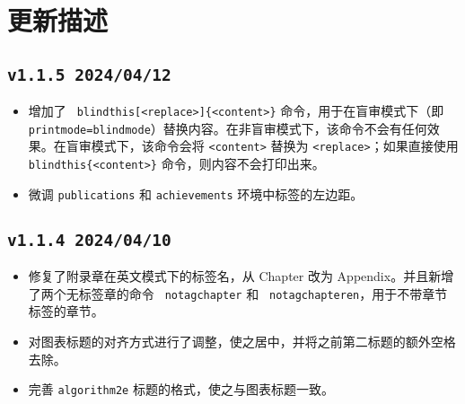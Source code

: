 \chapter{更新描述}

\section*{\texttt{v1.1.5 2024/04/12}}
\begin{itemize}
    \item 增加了 \texttt{ blindthis[<replace>]\{<content>\}} 命令，用于在盲审模式下（即 \texttt{printmode=blindmode}）替换内容。在非盲审模式下，该命令不会有任何效果。在盲审模式下，该命令会将 \texttt{<content>} 替换为 \texttt{<replace>}；如果直接使用 \texttt{ blindthis\{<content>\}} 命令，则内容不会打印出来。
    \item 微调 \texttt{publications} 和 \texttt{achievements} 环境中标签的左边距。
\end{itemize}

\section*{\texttt{v1.1.4 2024/04/10}}
\begin{itemize}
    \item 修复了附录章在英文模式下的标签名，从 Chapter 改为 Appendix。并且新增了两个无标签章的命令 \texttt{ notagchapter} 和 \texttt{ notagchapteren}，用于不带章节标签的章节。
    \item 对图表标题的对齐方式进行了调整，使之居中，并将之前第二标题的额外空格去除。
    \item 完善 \texttt{algorithm2e} 标题的格式，使之与图表标题一致。
\end{itemize}

